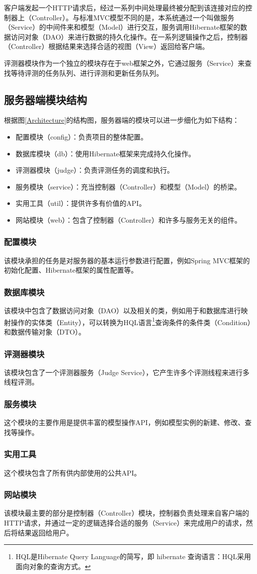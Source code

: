 客户端发起一个HTTP请求后，经过一系列中间处理最终被分配到该连接对应的控制器上（Controller）。与标准MVC模型不同的是，本系统通过一个叫做服务（Service）的中间件来和模型（Model）进行交互，服务调用Hibernate框架的数据访问对象（DAO）来进行数据的持久化操作。在一系列逻辑操作之后，控制器（Controller）根据结果来选择合适的视图（View）返回给客户端。

评测器模块作为一个独立的模块存在于web框架之外，它通过服务（Service）来查找等待评测的任务队列、进行评测和更新任务队列。

\subsection{服务器端模块结构}\label{sec:serverModelStructure}
根据图\ref{Architecture}的结构图，服务器端的模块可以进一步细化为如下结构：
\begin{itemize}
	\item 配置模块（config）：负责项目的整体配置。
	\item 数据库模块（db）：使用Hibernate框架来完成持久化操作。
	\item 评测器模块（judge）：负责评测任务的调度和执行。
	\item 服务模块（service）：充当控制器（Controller）和模型（Model）的桥梁。
	\item 实用工具（util）：提供许多有价值的API。
	\item 网站模块（web）：包含了控制器（Controller）和许多与服务无关的组件。
\end{itemize}

\subsubsection{配置模块}
该模块承担的任务是对服务器的基本运行参数进行配置，例如Spring MVC框架的初始化配置、Hibernate框架的属性配置等。

\subsubsection{数据库模块}
该模块中包含了数据访问对象（DAO）以及相关的类，例如用于和数据库进行映射操作的实体类（Entity），可以转换为HQL语言\footnote{HQL是Hibernate Query Language的简写，即 hibernate 查询语言：HQL采用面向对象的查询方式。}查询条件的条件类（Condition）和数据传输对象（DTO）。

\subsubsection{评测器模块}
该模块包含了一个评测器服务（Judge Service），它产生许多个评测线程来进行多线程评测。

\subsubsection{服务模块}
这个模块的主要作用是提供丰富的模型操作API，例如模型实例的新建、修改、查找等操作。

\subsubsection{实用工具}
这个模块包含了所有供内部使用的公共API。

\subsubsection{网站模块}
该模块最主要的部分是控制器（Controller）模块，控制器负责处理来自客户端的HTTP请求，并通过一定的逻辑选择合适的服务（Service）来完成用户的请求，然后将结果返回给用户。
